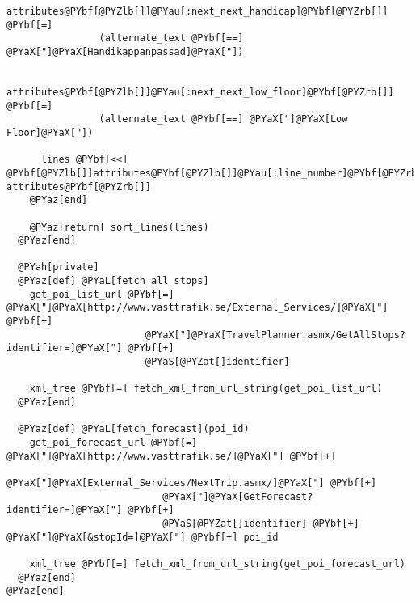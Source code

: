 \begin{Verbatim}[commandchars=@\[\]]
      attributes@PYbf[@PYZlb[]]@PYau[:next_next_handicap]@PYbf[@PYZrb[]] @PYbf[=]
                (alternate_text @PYbf[==] @PYaX["]@PYaX[Handikappanpassad]@PYaX["])
                
      attributes@PYbf[@PYZlb[]]@PYau[:next_next_low_floor]@PYbf[@PYZrb[]] @PYbf[=]
                (alternate_text @PYbf[==] @PYaX["]@PYaX[Low Floor]@PYaX["])

      lines @PYbf[<<] @PYbf[@PYZlb[]]attributes@PYbf[@PYZlb[]]@PYau[:line_number]@PYbf[@PYZrb[]], attributes@PYbf[@PYZrb[]]
    @PYaz[end]

    @PYaz[return] sort_lines(lines)
  @PYaz[end]

  @PYah[private]
  @PYaz[def] @PYaL[fetch_all_stops]
    get_poi_list_url @PYbf[=] @PYaX["]@PYaX[http://www.vasttrafik.se/External_Services/]@PYaX["] @PYbf[+]
                        @PYaX["]@PYaX[TravelPlanner.asmx/GetAllStops?identifier=]@PYaX["] @PYbf[+]
                        @PYaS[@PYZat[]identifier]
                        
    xml_tree @PYbf[=] fetch_xml_from_url_string(get_poi_list_url)
  @PYaz[end]

  @PYaz[def] @PYaL[fetch_forecast](poi_id)
    get_poi_forecast_url @PYbf[=] @PYaX["]@PYaX[http://www.vasttrafik.se/]@PYaX["] @PYbf[+]
                           @PYaX["]@PYaX[External_Services/NextTrip.asmx/]@PYaX["] @PYbf[+] 
                           @PYaX["]@PYaX[GetForecast?identifier=]@PYaX["] @PYbf[+]
                           @PYaS[@PYZat[]identifier] @PYbf[+] @PYaX["]@PYaX[&stopId=]@PYaX["] @PYbf[+] poi_id
                           
    xml_tree @PYbf[=] fetch_xml_from_url_string(get_poi_forecast_url)
  @PYaz[end]
@PYaz[end]
\end{Verbatim}
